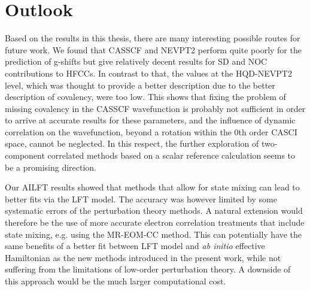 \section{Outlook}
Based on the results in this thesis, there are many interesting possible routes for future work.
We found that CASSCF and NEVPT2 perform
quite poorly for the prediction of g-shifts but give relatively decent
results for SD and NOC contributions to HFCCs. In contrast to that, the values at the HQD-NEVPT2 level, which was thought to provide a better description due to the better description of covalency, were too low. This shows
that fixing the problem of missing covalency in the CASSCF wavefunction is probably not sufficient in order to arrive at accurate results for these parameters, and the influence of dynamic
correlation on the wavefunction, beyond a rotation within the 0th
order CASCI space, cannot be neglected. 
In this respect, the further exploration of two-component correlated methods based on a scalar reference calculation seems to be a promising direction.\cite{WangGW_2008_64113}

Our AILFT results showed that methods that allow for state mixing can lead to better fits via
the LFT model. The accuracy was however limited by some systematic errors of the
perturbation theory methods. A natural extension would therefore be the use of more accurate electron correlation treatments that include state mixing, e.g. using the MR-EOM-CC method.\cite{DattaN_2012_204107, DemelDN_2013_134108, NooijDDKSLHN_2014_81102} This can potentially have the same benefits of a better fit between LFT model and \textit{ab initio} effective Hamiltonian as the new methods introduced in the present work, while not suffering from the limitations of low-order perturbation theory. A downside of this approach would be the much larger computational cost.

